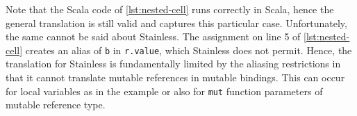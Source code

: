 Note that the Scala code of \autoref{lst:nested-cell} runs correctly in Scala,
hence the general translation is still valid and captures this particular case.
Unfortunately, the same cannot be said about Stainless. The assignment on line 5
of \autoref{lst:nested-cell} creates an alias of \lstinline!b! in
\lstinline!r.value!, which Stainless does not permit. Hence, the translation for
Stainless is fundamentally limited by the aliasing restrictions in that it
cannot translate mutable references in mutable bindings. This can occur for
local variables as in the example or also for \lstinline!mut! function
parameters of mutable reference type.
